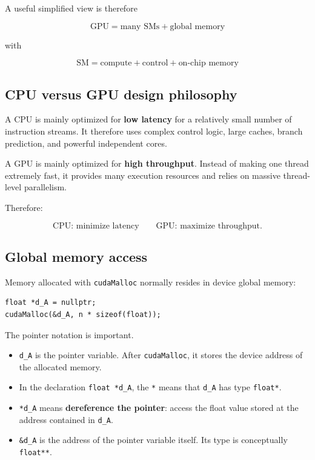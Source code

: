\documentclass[11pt,a4paper]{article}
\begin{document}
A useful simplified view is therefore

\[
\boxed{
\text{GPU}
=
\text{many SMs}
+
\text{global memory}
}
\]

with

\[
\boxed{
\text{SM}
=
\text{compute}
+
\text{control}
+
\text{on-chip memory}
}
\]

\subsection{CPU versus GPU design philosophy}

A CPU is mainly optimized for \textbf{low latency} for a relatively small number of instruction streams. It therefore uses complex control logic, large caches, branch prediction, and powerful independent cores.

A GPU is mainly optimized for \textbf{high throughput}. Instead of making one thread extremely fast, it provides many execution resources and relies on massive thread-level parallelism.

Therefore:

\[
\text{CPU: minimize latency}
\qquad
\text{GPU: maximize throughput}.
\]

\subsection{Global memory access}

Memory allocated with \texttt{cudaMalloc} normally resides in device global memory:

\begin{lstlisting}
float *d_A = nullptr;
cudaMalloc(&d_A, n * sizeof(float));
\end{lstlisting}

The pointer notation is important.

\begin{itemize}
    \item \texttt{d\_A} is the pointer variable. After \texttt{cudaMalloc}, it stores the device address of the allocated memory.
    \item In the declaration \texttt{float *d\_A}, the \texttt{*} means that \texttt{d\_A} has type \texttt{float*}.
    \item \texttt{*d\_A} means \textbf{dereference the pointer}: access the float value stored at the address contained in \texttt{d\_A}.
    \item \texttt{\&d\_A} is the address of the pointer variable itself. Its type is conceptually \texttt{float**}.
\end{itemize}
\end{document}

